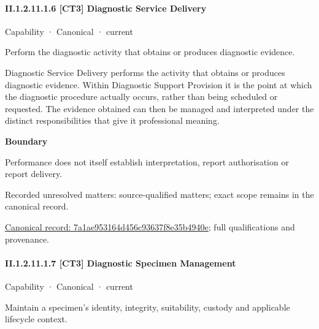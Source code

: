 \paragraph*{II.1.2.11.1.6 [CT3] Diagnostic Service Delivery}
\label{navigation:II.1.2.11.1.6}

\label{element:7a1ae953164d456c93637f8e35b4940e}
{\small Capability · Canonical · current}\par

Perform the diagnostic activity that obtains or produces diagnostic evidence.



Diagnostic Service Delivery performs the activity that obtains or produces diagnostic evidence. Within Diagnostic Support Provision it is the point at which the diagnostic procedure actually occurs, rather than being scheduled or requested. The evidence obtained can then be managed and interpreted under the distinct responsibilities that give it professional meaning.



\textbf{Boundary}



Performance does not itself establish interpretation, report authorisation or report delivery.


{\small Recorded unresolved matters: source-qualified matters; exact scope remains in the canonical record.}\par
{\footnotesize \href{../../../../continuum/strategy/capability/7a1ae953164d456c93637f8e35b4940e.md}{Canonical record: 7a1ae953164d456c93637f8e35b4940e}; full qualifications and provenance.}\par
\paragraph*{II.1.2.11.1.7 [CT3] Diagnostic Specimen Management}
\label{navigation:II.1.2.11.1.7}

\label{element:93ab99a055314129984a18ea85db5cc2}
{\small Capability · Canonical · current}\par

Maintain a specimen’s identity, integrity, suitability, custody and applicable lifecycle context.



